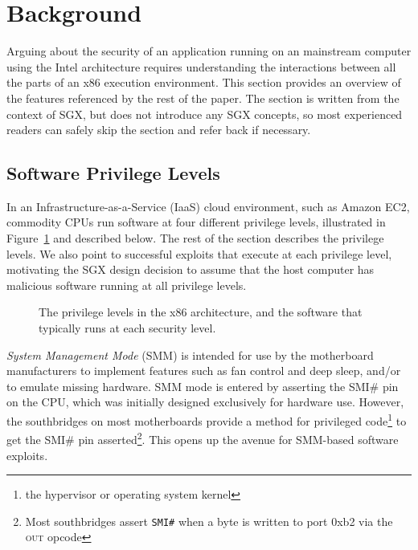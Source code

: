 \section{Background}
\label{sec:background}

Arguing about the security of an application running on an mainstream computer
using the Intel architecture requires understanding the interactions between
all the parts of an x86 execution environment. This section provides an
overview of the features referenced by the rest of the paper. The section is
written from the context of SGX, but does not introduce any SGX concepts, so
most experienced readers can safely skip the section and refer back if
necessary.


\subsection{Software Privilege Levels}
\label{sec:rings}

In an Infrastructure-as-a-Service (IaaS) cloud environment, such as Amazon EC2,
commodity CPUs run software at four different privilege levels, illustrated in
Figure~\ref{fig:cpu_rings} and described below. The rest of the section
describes the privilege levels. We also point to successful exploits that
execute at each privilege level, motivating the SGX design decision to assume
that the host computer has malicious software running at all privilege levels.

\begin{figure}[hbtp]
  \caption{
    The privilege levels in the x86 architecture, and the software that
    typically runs at each security level.
  }
  \label{fig:cpu_rings}
\end{figure}

\textit{System Management Mode} (SMM) is intended for use by the motherboard
manufacturers to implement features such as fan control and deep sleep, and/or
to emulate missing hardware. SMM mode is entered by asserting the SMI\# pin on
the CPU, which was initially designed exclusively for hardware use. However,
the southbridges on most motherboards provide a method for privileged
code\footnote{the hypervisor or operating system kernel} to get the SMI\# pin
asserted\footnote{Most southbridges assert \texttt{SMI\#} when a byte is
  written to port 0xb2 via the \textsc{out} opcode}.
This opens up the avenue for SMM-based software exploits.

